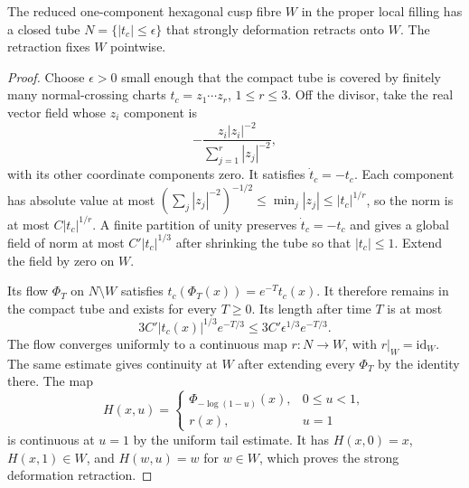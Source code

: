 \begin{lemma}
\hypertarget{tag-TOPOLOGY-CUSP-TAG}{}\label{I:lem:cusp-tube-contraction}
The reduced one-component hexagonal cusp fibre $W$ in the proper local
filling has a closed tube $N=\{|t_c|\le\epsilon\}$ that strongly
deformation retracts onto $W$. The retraction fixes $W$ pointwise.
\end{lemma}

\begin{proof}
Choose $\epsilon>0$ small enough that the compact tube is covered by
finitely many normal-crossing charts
$t_c=z_1\cdots z_r$, $1\le r\le3$. Off the divisor, take the real
vector field whose $z_i$ component is
\[
 -\frac{z_i|z_i|^{-2}}{\sum_{j=1}^r|z_j|^{-2}},
\]
with its other coordinate components zero. It satisfies
$\dot t_c=-t_c$. Each component has absolute value at most
$(\sum_j|z_j|^{-2})^{-1/2}\le\min_j|z_j|
\le|t_c|^{1/r}$, so the norm is at most $C|t_c|^{1/r}$.
A finite partition of unity preserves $\dot t_c=-t_c$ and gives a
global field of norm at most $C'|t_c|^{1/3}$ after shrinking the tube
so that $|t_c|\le1$. Extend the field by zero on $W$.

Its flow $\Phi_T$ on $N\setminus W$ satisfies
$t_c(\Phi_T(x))=e^{-T}t_c(x)$. It therefore remains in the compact
tube and exists for every $T\ge0$. Its length after time $T$ is at most
\[
 3C'|t_c(x)|^{1/3}e^{-T/3}
 \le3C'\epsilon^{1/3}e^{-T/3}.
\]
The flow converges uniformly to a continuous map $r:N\to W$,
with $r|_W=\mathrm{id}_W$. The same estimate gives continuity at
$W$ after extending every $\Phi_T$ by the identity there. The map
\[
 H(x,u)=
 \begin{cases}
 \Phi_{-\log(1-u)}(x),&0\le u<1,\\
 r(x),&u=1
 \end{cases}
\]
is continuous at $u=1$ by the uniform tail estimate. It has
$H(x,0)=x$, $H(x,1)\in W$, and $H(w,u)=w$ for $w\in W$,
which proves the strong deformation retraction.
\end{proof}

